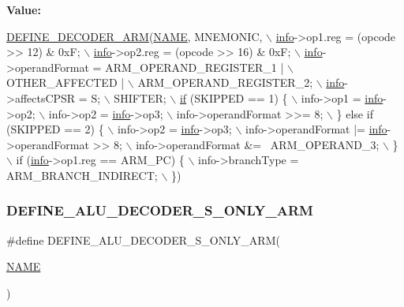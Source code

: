 {\bfseries Value\+:}
\begin{DoxyCode}
\mbox{\hyperlink{decoder-arm_8c_a4fe6e4683fda92c7774b0678f5ab95cc}{DEFINE\_DECODER\_ARM}}(\mbox{\hyperlink{inflate_8h_a164ea0159d5f0b5f12a646f25f99eceaa67bc2ced260a8e43805d2480a785d312}{NAME}}, MNEMONIC, \(\backslash\)
        \mbox{\hyperlink{libretro_8h_structretro__game__info}{info}}->op1.reg = (opcode >> 12) & 0xF; \(\backslash\)
        \mbox{\hyperlink{libretro_8h_structretro__game__info}{info}}->op2.reg = (opcode >> 16) & 0xF; \(\backslash\)
        \mbox{\hyperlink{libretro_8h_structretro__game__info}{info}}->operandFormat = ARM\_OPERAND\_REGISTER\_1 | \(\backslash\)
            OTHER\_AFFECTED | \(\backslash\)
            ARM\_OPERAND\_REGISTER\_2; \(\backslash\)
        \mbox{\hyperlink{libretro_8h_structretro__game__info}{info}}->affectsCPSR = S; \(\backslash\)
        SHIFTER; \(\backslash\)
        \mbox{\hyperlink{isa-arm_8c_a0736bf8f9c6b829a423d7d7a43b781e8}{if}} (SKIPPED == 1) \{ \(\backslash\)
            info->op1 = \mbox{\hyperlink{libretro_8h_structretro__game__info}{info}}->op2; \(\backslash\)
            info->op2 = \mbox{\hyperlink{libretro_8h_structretro__game__info}{info}}->op3; \(\backslash\)
            info->operandFormat >>= 8; \(\backslash\)
        \} \textcolor{keywordflow}{else} \textcolor{keywordflow}{if} (SKIPPED == 2) \{ \(\backslash\)
            info->op2 = \mbox{\hyperlink{libretro_8h_structretro__game__info}{info}}->op3; \(\backslash\)
            info->operandFormat |= \mbox{\hyperlink{libretro_8h_structretro__game__info}{info}}->operandFormat >> 8; \(\backslash\)
            info->operandFormat &= ~ARM\_OPERAND\_3; \(\backslash\)
        \} \(\backslash\)
        if (\mbox{\hyperlink{libretro_8h_structretro__game__info}{info}}->op1.reg == ARM\_PC) \{ \(\backslash\)
            info->branchType = ARM\_BRANCH\_INDIRECT; \(\backslash\)
        \})
\end{DoxyCode}
\mbox{\label{decoder-arm_8c_a70c90343c0e681e30b66003504112865}} 
\subsubsection{\texorpdfstring{D\+E\+F\+I\+N\+E\+\_\+\+A\+L\+U\+\_\+\+D\+E\+C\+O\+D\+E\+R\+\_\+\+S\+\_\+\+O\+N\+L\+Y\+\_\+\+A\+RM}{DEFINE\_ALU\_DECODER\_S\_ONLY\_ARM}}
{\footnotesize\ttfamily \#define D\+E\+F\+I\+N\+E\+\_\+\+A\+L\+U\+\_\+\+D\+E\+C\+O\+D\+E\+R\+\_\+\+S\+\_\+\+O\+N\+L\+Y\+\_\+\+A\+RM(\begin{DoxyParamCaption}\item[{}]{\mbox{\hyperlink{inflate_8h_a164ea0159d5f0b5f12a646f25f99eceaa67bc2ced260a8e43805d2480a785d312}{N\+A\+ME}} }\end{DoxyParamCaption})}

